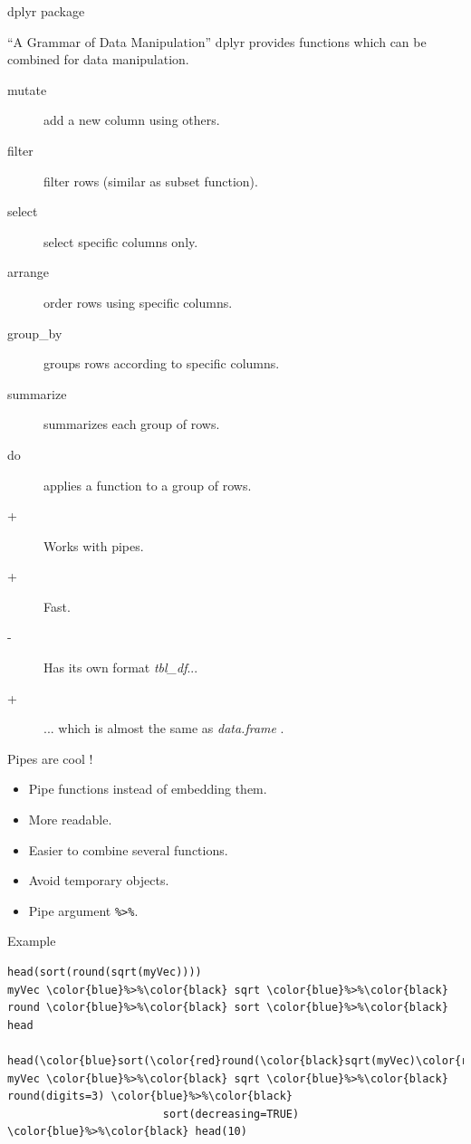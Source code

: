 \documentclass[10pt]{beamer}
\newcommand{\df}{{\it data.frame} }
\begin{document}
\begin{frame}{{\sf dplyr} package}
  \begin{block}{``A Grammar of Data Manipulation''}
    {\sf dplyr} provides functions which can be combined for data manipulation.
    \begin{description}
    \item[mutate] add a new column using others.
    \item[filter] filter rows (similar as {\sf subset} function).
    \item[select] select specific columns only.
    \item[arrange] order rows using specific columns.
    \item[group\_by] groups rows according to specific columns.
    \item[summarize] summarizes each group of rows.
    \item[do] applies a function to a group of rows.
    \end{description}
  \end{block}
  \begin{block}{}
    \begin{description}
      \item[+] Works with pipes.
      \item[+] Fast.
      \item[-] Has its own format {\it tbl\_df}...
      \item[+] ... which is almost the same as \df.
    \end{description}
  \end{block}
\end{frame}

\begin{frame}[fragile]{Pipes are cool !}
  \begin{block}{}
    \begin{itemize}
    \item Pipe functions instead of embedding them.
    \item More readable.
    \item Easier to combine several functions.
    \item Avoid temporary objects.
    \item Pipe argument \verb!%>%!.
    \end{itemize}
  \end{block}
  \begin{exampleblock}{Example}
\begin{Verbatim}[commandchars=\\\{\}]
head(sort(round(sqrt(myVec))))
myVec \color{blue}%>%\color{black} sqrt \color{blue}%>%\color{black} round \color{blue}%>%\color{black} sort \color{blue}%>%\color{black} head

head(\color{blue}sort(\color{red}round(\color{black}sqrt(myVec)\color{red},digits=3)\color{blue},decreasing=TRUE)\color{black},10)
myVec \color{blue}%>%\color{black} sqrt \color{blue}%>%\color{black} round(digits=3) \color{blue}%>%\color{black} 
                        sort(decreasing=TRUE) \color{blue}%>%\color{black} head(10)
\end{Verbatim}
  \end{exampleblock}
\end{frame}
\end{document}
